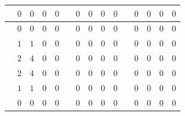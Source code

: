 \begin{table}[H]
\begin{tabular}{|c|c|c|c|c|c|c|c|c|c|c|c|c|c|c|}
\hline
\cellcolor{iteracion}{\bfseries\boldmath $13$} & \cellcolor{cebra}$0$ & \cellcolor{cebra}$0$ & \cellcolor{cebra}$0$ & \cellcolor{cebra}$0$ & \cellcolor{iteracion}{\bfseries\boldmath $47$} & \cellcolor{cebra}$0$ & \cellcolor{cebra}$0$ & \cellcolor{cebra}$0$ & \cellcolor{cebra}$0$ & \cellcolor{iteracion}{\bfseries\boldmath $81$} & \cellcolor{cebra}$0$ & \cellcolor{cebra}$0$ & \cellcolor{cebra}$0$ & \cellcolor{cebra}$0$ \\
\hline
\cellcolor{iteracion}{\bfseries\boldmath $14$} & $0$ & $0$ & $0$ & $0$ & \cellcolor{iteracion}{\bfseries\boldmath $48$} & $0$ & $0$ & $0$ & $0$ & \cellcolor{iteracion}{\bfseries\boldmath $82$} & $0$ & $0$ & $0$ & $0$ \\
\hline
\cellcolor{destacado}{\bfseries\boldmath $15$} & \cellcolor{destacado}$1$ & \cellcolor{destacado}$1$ & \cellcolor{destacado}$0$ & \cellcolor{destacado}$0$ & \cellcolor{iteracion}{\bfseries\boldmath $49$} & \cellcolor{cebra}$0$ & \cellcolor{cebra}$0$ & \cellcolor{cebra}$0$ & \cellcolor{cebra}$0$ & \cellcolor{iteracion}{\bfseries\boldmath $83$} & \cellcolor{cebra}$0$ & \cellcolor{cebra}$0$ & \cellcolor{cebra}$0$ & \cellcolor{cebra}$0$ \\
\hline
\cellcolor{destacado}{\bfseries\boldmath $16$} & \cellcolor{destacado}$2$ & \cellcolor{destacado}$4$ & \cellcolor{destacado}$0$ & \cellcolor{destacado}$0$ & \cellcolor{iteracion}{\bfseries\boldmath $50$} & $0$ & $0$ & $0$ & $0$ & \cellcolor{iteracion}{\bfseries\boldmath $84$} & $0$ & $0$ & $0$ & $0$ \\
\hline
\cellcolor{iteracion}{\bfseries\boldmath $17$} & \cellcolor{cebra}$2$ & \cellcolor{cebra}$4$ & \cellcolor{cebra}$0$ & \cellcolor{cebra}$0$ & \cellcolor{iteracion}{\bfseries\boldmath $51$} & \cellcolor{cebra}$0$ & \cellcolor{cebra}$0$ & \cellcolor{cebra}$0$ & \cellcolor{cebra}$0$ & \cellcolor{iteracion}{\bfseries\boldmath $85$} & \cellcolor{cebra}$0$ & \cellcolor{cebra}$0$ & \cellcolor{cebra}$0$ & \cellcolor{cebra}$0$ \\
\hline
\cellcolor{iteracion}{\bfseries\boldmath $18$} & $1$ & $1$ & $0$ & $0$ & \cellcolor{iteracion}{\bfseries\boldmath $52$} & $0$ & $0$ & $0$ & $0$ & \cellcolor{iteracion}{\bfseries\boldmath $86$} & $0$ & $0$ & $0$ & $0$ \\
\hline
\cellcolor{iteracion}{\bfseries\boldmath $19$} & \cellcolor{cebra}$0$ & \cellcolor{cebra}$0$ & \cellcolor{cebra}$0$ & \cellcolor{cebra}$0$ & \cellcolor{iteracion}{\bfseries\boldmath $53$} & \cellcolor{cebra}$0$ & \cellcolor{cebra}$0$ & \cellcolor{cebra}$0$ & \cellcolor{cebra}$0$ & \cellcolor{iteracion}{\bfseries\boldmath $87$} & \cellcolor{cebra}$0$ & \cellcolor{cebra}$0$ & \cellcolor{cebra}$0$ & \cellcolor{cebra}$0$ \\

\end{tabular}
\end{table}
